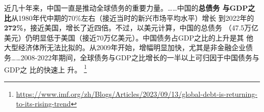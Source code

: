 

近几十年来，中国一直是推动全球债务的重要力量。……中国的\textbf{总债务
  与GDP之比}从1980年代中期的70\%左右（接近当时的新兴市场平均水平）增长
到2022年的\textbf{272\%}，接近美国，增长了近四倍。不过，以美元计算，中国的总债务
（47.5万亿美元）仍明显低于美国（接近70万亿美元）。中国债务占GDP之比的上升是其
他大型经济体所无法比拟的。从2009年开始，增幅明显加快，尤其是非金融企业债
务……2008-2022年期间，全球债务与GDP之比增长的一半以上可归因于中国债务与GDP之
比的快速上
升。
\footnote{\url{https://www.imf.org/zh/Blogs/Articles/2023/09/13/global-debt-is-returning-to-its-rising-trend}}





